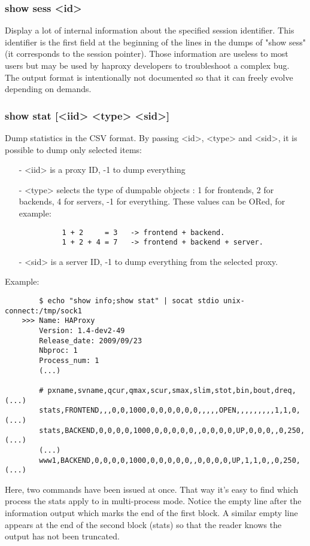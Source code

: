 \subsubsection[show sess]{show sess <id>}
  Display a lot of internal information about the specified session identifier.
  This identifier is the first field at the beginning of the lines in the dumps
  of "show sess" (it corresponds to the session pointer). Those information are
  useless to most users but may be used by haproxy developers to troubleshoot a
  complex bug. The output format is intentionally not documented so that it can
  freely evolve depending on demands.

\subsubsection[show stat]{show stat [<iid> <type> <sid>]}
  Dump statistics in the CSV format. By passing <id>, <type> and <sid>, it is
  possible to dump only selected items:
  \begin{itemize}
  \item[-] <iid> is a proxy ID, -1 to dump everything
  \item[-] <type> selects the type of dumpable objects : 1 for frontends, 2 for
       backends, 4 for servers, -1 for everything. These values can be ORed,
       for example:
       \begin{verbatim}
          1 + 2     = 3   -> frontend + backend.
          1 + 2 + 4 = 7   -> frontend + backend + server.
       \end{verbatim}
  \item[-] <sid> is a server ID, -1 to dump everything from the selected proxy.
  \end{itemize}

  Example:
  \begin{verbatim}
        $ echo "show info;show stat" | socat stdio unix-connect:/tmp/sock1
    >>> Name: HAProxy
        Version: 1.4-dev2-49
        Release_date: 2009/09/23
        Nbproc: 1
        Process_num: 1
        (...)

        # pxname,svname,qcur,qmax,scur,smax,slim,stot,bin,bout,dreq,  (...)
        stats,FRONTEND,,,0,0,1000,0,0,0,0,0,0,,,,,OPEN,,,,,,,,,1,1,0, (...)
        stats,BACKEND,0,0,0,0,1000,0,0,0,0,0,,0,0,0,0,UP,0,0,0,,0,250,(...)
        (...)
        www1,BACKEND,0,0,0,0,1000,0,0,0,0,0,,0,0,0,0,UP,1,1,0,,0,250, (...)
    \end{verbatim}

    Here, two commands have been issued at once. That way it's easy to find
    which process the stats apply to in multi-process mode. Notice the empty
    line after the information output which marks the end of the first block.
    A similar empty line appears at the end of the second block (stats) so that
    the reader knows the output has not been truncated.

